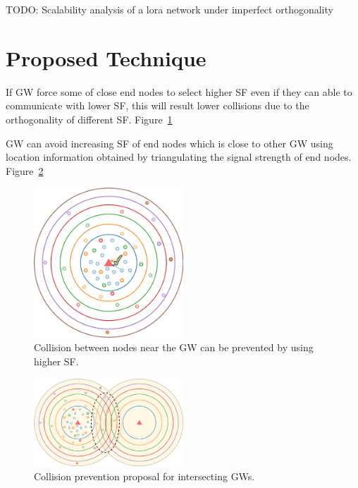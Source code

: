 \documentclass[conference]{IEEEtran}
\begin{document}
\par TODO: Scalability analysis of a lora network under imperfect orthogonality \cite{8430542}


\section{Proposed Technique}
\par If GW force some of close end nodes to select higher SF even if they can able to communicate with lower SF, this will result lower collisions due to the orthogonality of different SF. Figure~\ref{fig:proposal_single_gw}

\par GW can avoid increasing SF of end nodes which is close to other GW using location information obtained by triangulating the signal strength of end nodes. Figure~\ref{fig:proposal_multi_gw}

\begin{figure}
\centering
\includegraphics[width=0.5\textwidth]{lora2}
\caption{Collision between nodes near the GW can be prevented by using higher SF.}
\label{fig:proposal_single_gw}
\end{figure}

\begin{figure}
\centering
\includegraphics[width=0.5\textwidth]{lora3}
\caption{Collision prevention proposal for intersecting GWs.}
\label{fig:proposal_multi_gw}
\end{figure}
\end{document}
